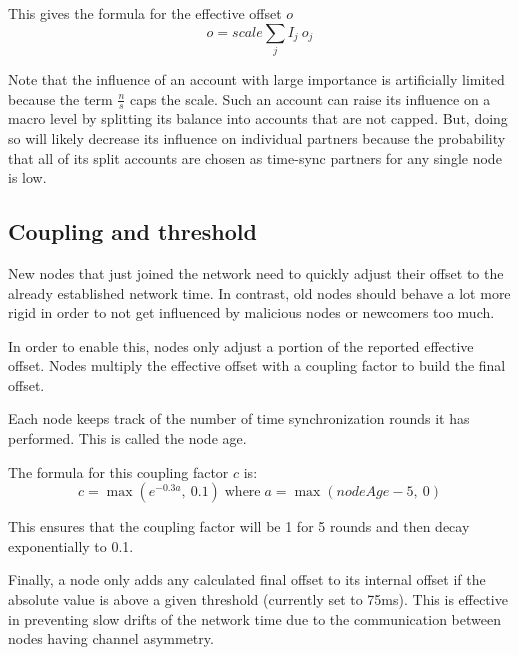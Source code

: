 This gives the formula for the effective offset $o$
$$ o = \mathit{scale} \sum_j I_j \: o_j$$

Note that the influence of an account with large importance is artificially limited because the term $\frac{n}{s} $ caps the scale.
Such an account can raise its influence on a macro level by splitting its balance into accounts that are not capped.
But, doing so will likely decrease its influence on individual partners because the probability that all of its split accounts are chosen as time-sync partners for any single node is low.

\subsection{Coupling and threshold}

New nodes that just joined the network need to quickly adjust their offset to the already established network time.
In contrast, old nodes should behave a lot more rigid in order to not get influenced by malicious nodes or newcomers too much.

In order to enable this, nodes only adjust a portion of the reported effective offset.
Nodes multiply the effective offset with a coupling factor to build the final offset.

Each node keeps track of the number of time synchronization rounds it has performed.
This is called the node age.

The formula for this coupling factor $c$ is:
$$c = \max\left(e^{-0.3a},\: 0.1\right) \; \text{where} \; a = \max(nodeAge - 5,\: 0)$$

This ensures that the coupling factor will be 1 for 5 rounds and then decay exponentially to 0.1.

\begin{figure}
\end{figure}

Finally, a node only adds any calculated final offset to its internal offset if the absolute value is above a given threshold (currently set to 75ms).
This is effective in preventing slow drifts of the network time due to the communication between nodes having channel asymmetry.
